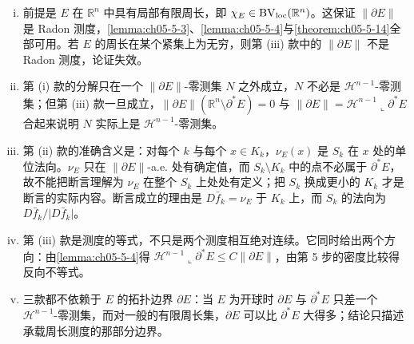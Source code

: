 \documentclass[../../main.tex]{subfiles}%
\begin{document}
\begin{remark}\label{remark:ch05-thm-5-15-条件}
\begin{enumerate}[(i)]
\item 前提是 $E$ 在 $\mathbb{R}^n$ 中具有局部有限周长，即 $\chi_E\in\mathrm{BV}_{\mathrm{loc}}(\mathbb{R}^n)$。这保证 $\lVert\partial E\rVert$ 是 Radon 测度，\cref{lemma:ch05-5-3}、\cref{lemma:ch05-5-4}与\cref{theorem:ch05-5-14}全部可用。若 $E$ 的周长在某个紧集上为无穷，则第 (iii) 款中的 $\lVert\partial E\rVert$ 不是 Radon 测度，论证失效。%
\item 第 (i) 款的分解只在一个 $\lVert\partial E\rVert$-零测集 $N$ 之外成立，$N$ 不必是 $\mathcal{H}^{n-1}$-零测集；但第 (iii) 款一旦成立，$\lVert\partial E\rVert(\mathbb{R}^n\setminus\partial^*E)=0$ 与 $\lVert\partial E\rVert=\mathcal{H}^{n-1}\llcorner\partial^*E$ 合起来说明 $N$ 实际上是 $\mathcal{H}^{n-1}$-零测集。
\item 第 (ii) 款的准确含义是：对每个 $k$ 与每个 $x\in K_k$，$\nu_E(x)$ 是 $S_k$ 在 $x$ 处的单位法向。$\nu_E$ 只在 $\lVert\partial E\rVert$-a.e. 处有确定值，而 $S_k\setminus K_k$ 中的点不必属于 $\partial^*E$，故不能把断言理解为 $\nu_E$ 在整个 $S_k$ 上处处有定义；把 $S_k$ 换成更小的 $K_k$ 才是断言的实际内容。断言成立的理由是 $D\bar f_k=\nu_E$ 于 $K_k$ 上，而 $S_k$ 的法向为 $D\bar f_k/\lvert D\bar f_k\rvert$。
\item 第 (iii) 款是测度的等式，不只是两个测度相互绝对连续。它同时给出两个方向：由\cref{lemma:ch05-5-4}得 $\mathcal{H}^{n-1}\llcorner\partial^*E\leqslant C\lVert\partial E\rVert$，由第 5 步的密度比较得反向不等式。%
\item 三款都不依赖于 $E$ 的拓扑边界 $\partial E$：当 $E$ 为开球时 $\partial E$ 与 $\partial^*E$ 只差一个 $\mathcal{H}^{n-1}$-零测集，而对一般的有限周长集，$\partial E$ 可以比 $\partial^*E$ 大得多；结论只描述承载周长测度的那部分边界。
\end{enumerate}
\end{remark}
\end{document}
